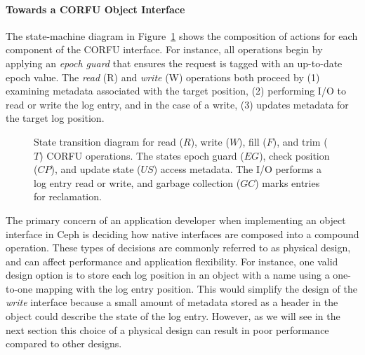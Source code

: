 \documentclass[10pt,twocolumn]{article}
\begin{document}
\paragraph*{Towards a CORFU Object Interface}
The state-machine diagram in Figure~\ref{fig:corfu-sm} shows the composition of
actions for each component of the CORFU interface. For instance, all operations
begin by applying an \emph{epoch guard} that ensures the request is tagged with
an up-to-date epoch value. The \emph{read} (R) and \emph{write} (W) operations
both proceed by (1) examining metadata associated with the target position, (2)
performing I/O to read or write the log entry, and in the case of a write, (3)
updates metadata for the target log position.

\begin{figure}[t]
\centering
{}
\caption{State transition diagram for read ($R$), write ($W$), fill ($F$), and
trim ($T$) CORFU operations. The states epoch guard ($EG$), check position ($CP$),
and update state ($US$) access metadata. The I/O performs a log entry read or
write, and garbage collection ($GC$) marks entries for reclamation.}
\label{fig:corfu-sm}
\end{figure}

The primary concern of an application developer when implementing an object
interface in Ceph is deciding how native interfaces are composed into a
compound operation. These types of decisions are commonly referred to as
physical design, and can affect performance and application flexibility.  For
instance, one valid design option is to store each log position in an object
with a name using a one-to-one mapping with the log entry position.  This
would simplify the design of the \emph{write} interface because a small amount
of metadata stored as a header in the object could describe the state of the
log entry.  However, as we will see in the next section this choice of a
physical design can result in poor performance compared to other designs.
\end{document}
